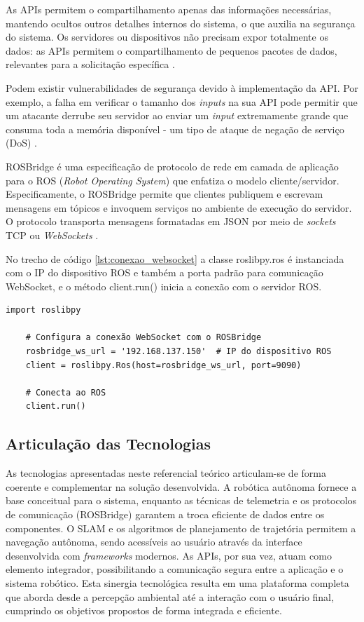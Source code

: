 As APIs permitem o compartilhamento apenas das informações necessárias, mantendo ocultos outros detalhes internos do sistema, o que auxilia na segurança do sistema. Os servidores ou dispositivos não precisam expor totalmente os dados: as APIs permitem o compartilhamento de pequenos pacotes de dados, relevantes para a solicitação específica \cite{IbmAPI}.

Podem existir vulnerabilidades de segurança devido à implementação da API. Por exemplo, a falha em verificar o tamanho dos \textit{inputs} na sua API pode permitir que um atacante derrube seu servidor ao enviar um \textit{input} extremamente grande que consuma toda a memória disponível - um tipo de ataque de negação de serviço (DoS) \cite{APISecurity}.

ROSBridge é uma especificação de protocolo de rede em camada de aplicação para o ROS (\textit{Robot Operating System}) que enfatiza o modelo cliente/servidor. Especificamente, o ROSBridge permite que clientes publiquem e escrevam mensagens em tópicos e invoquem serviços no ambiente de execução do servidor. O protocolo transporta mensagens formatadas em JSON por meio de \textit{sockets} TCP ou \textit{WebSockets} \cite{ROSBridge}.

No trecho de código \ref{lst:conexao_websocket} a classe roslibpy.ros é instanciada com o IP do dispositivo ROS e também a porta padrão para comunicação WebSocket, e o método client.run() inicia a conexão com o servidor ROS.   

\begin{lstlisting}[caption={Configuração da Conexão WebSocket com ROSBridge},label={lst:conexao_websocket}]
    import roslibpy
    
    # Configura a conexão WebSocket com o ROSBridge
    rosbridge_ws_url = '192.168.137.150'  # IP do dispositivo ROS
    client = roslibpy.Ros(host=rosbridge_ws_url, port=9090)

    # Conecta ao ROS
    client.run()
\end{lstlisting}
    
\subsection{Articulação das Tecnologias}
As tecnologias apresentadas neste referencial teórico articulam-se de forma coerente e complementar na solução desenvolvida. A robótica autônoma fornece a base conceitual para o sistema, enquanto as técnicas de telemetria e os protocolos de comunicação (ROSBridge) garantem a troca eficiente de dados entre os componentes. O SLAM e os algoritmos de planejamento de trajetória permitem a navegação autônoma, sendo acessíveis ao usuário através da interface desenvolvida com \textit{frameworks} modernos. As APIs, por sua vez, atuam como elemento integrador, possibilitando a comunicação segura entre a aplicação e o sistema robótico. Esta sinergia tecnológica resulta em uma plataforma completa que aborda desde a percepção ambiental até a interação com o usuário final, cumprindo os objetivos propostos de forma integrada e eficiente.